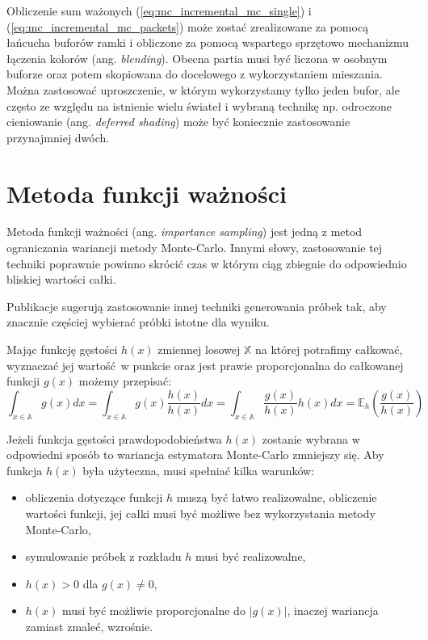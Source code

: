 \documentclass[../main.tex]{subfiles}
\begin{document}
Obliczenie sum ważonych (\ref{eq:mc_incremental_mc_single}) i (\ref{eq:mc_incremental_mc_packets}) może zostać zrealizowane za pomocą łańcucha buforów ramki i obliczone za pomocą wspartego sprzętowo mechanizmu łączenia kolorów (ang. \textit{blending}). Obecna partia musi być liczona w osobnym buforze oraz potem skopiowana do docelowego z wykorzystaniem mieszania. Można zastosować uproszczenie, w którym wykorzystamy tylko jeden bufor, ale często ze względu na istnienie wielu świateł i wybraną technikę np. odroczone cieniowanie (ang. \textit{deferred shading}) może być koniecznie zastosowanie przynajmniej dwóch.

\section{Metoda funkcji ważności}

Metoda funkcji ważności (ang. \textit{importance sampling}) jest jedną z metod ograniczania wariancji metody Monte-Carlo. Innymi słowy, zastosowanie tej techniki poprawnie powinno skrócić czas w którym ciąg zbiegnie do odpowiednio bliskiej wartości całki.

Publikacje \cite{Veach,MonteCarloAnderson} sugerują zastosowanie innej techniki generowania próbek tak, aby znacznie częściej wybierać próbki istotne dla wyniku.

Mając funkcję gęstości $h(x)$ zmiennej losowej $\mathbb{X}$ na której potrafimy całkować, wyznaczać jej wartość w punkcie oraz jest prawie proporcjonalna do całkowanej funkcji $g(x)$ możemy przepisać:
\begin{equation}
  \int_{x \in \mathbb{A}} { g(x) dx } =
  \int_{x \in \mathbb{A}} { g(x) \frac{h(x)}{h(x)} dx } =
  \int_{x \in \mathbb{A}} { \frac{g(x)}{h(x)} h(x) dx } =
  \mathbb{E}_{h}\left({ \frac{g(x)}{h(x)} }\right)
\end{equation}

Jeżeli funkcja gęstości prawdopodobieństwa $h(x)$ zostanie wybrana w odpowiedni sposób to wariancja estymatora Monte-Carlo zmniejszy się. Aby funkcja $h(x)$ była użyteczna, musi spełniać kilka warunków:

\begin{itemize}

  \item obliczenia dotyczące funkcji $h$ muszą być łatwo realizowalne, obliczenie wartości funkcji, jej całki musi być możliwe bez wykorzystania metody Monte-Carlo,

  \item symulowanie próbek z rozkładu $h$ musi być realizowalne,

  \item $h(x) > 0$ dla $g(x) \neq 0$,

  \item $h(x)$ musi być możliwie proporcjonalne do $|g(x)|$, inaczej wariancja zamiast zmaleć, wzrośnie.

\end{itemize}
\end{document}
